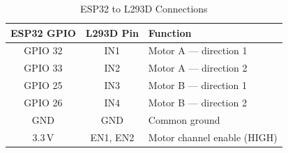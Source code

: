 \begin{table}[H]
\caption{ESP32 to L293D Connections}
\centering
\begin{tabular}{ccl}
\toprule
\textbf{ESP32 GPIO} & \textbf{L293D Pin} & \textbf{Function} \\
\midrule
GPIO 32 & IN1      & Motor A --- direction 1 \\
GPIO 33 & IN2      & Motor A --- direction 2 \\
GPIO 25 & IN3      & Motor B --- direction 1 \\
GPIO 26 & IN4      & Motor B --- direction 2 \\
GND     & GND      & Common ground \\
3.3\,V  & EN1, EN2 & Motor channel enable (HIGH) \\
\bottomrule
\end{tabular}
\label{tab:wiring}
\end{table}